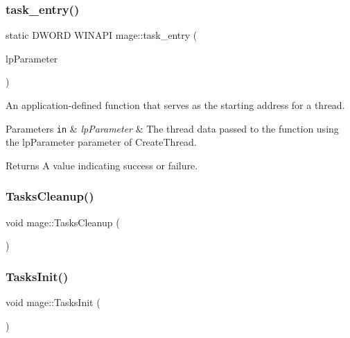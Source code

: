 \subsubsection{\texorpdfstring{task\+\_\+entry()}{task\_entry()}}
{\footnotesize\ttfamily static D\+W\+O\+RD W\+I\+N\+A\+PI mage\+::task\+\_\+entry (\begin{DoxyParamCaption}\item[{L\+P\+V\+O\+ID}]{lp\+Parameter }\end{DoxyParamCaption})\hspace{0.3cm}{\ttfamily [static]}}

An application-\/defined function that serves as the starting address for a thread.


\begin{DoxyParams}[1]{Parameters}
\mbox{\tt in}  & {\em lp\+Parameter} & The thread data passed to the function using the {\ttfamily lp\+Parameter} parameter of Create\+Thread. \\
\hline
\end{DoxyParams}
\begin{DoxyReturn}{Returns}
A value indicating success or failure. 
\end{DoxyReturn}
\hypertarget{namespacemage_a118ddaa5d9606328a0af412c85832e6b}{}\label{namespacemage_a118ddaa5d9606328a0af412c85832e6b} 
\subsubsection{\texorpdfstring{Tasks\+Cleanup()}{TasksCleanup()}}
{\footnotesize\ttfamily void mage\+::\+Tasks\+Cleanup (\begin{DoxyParamCaption}{ }\end{DoxyParamCaption})}

\hypertarget{namespacemage_a8252f7acebefd3efe34a15cc51e4a7ac}{}\label{namespacemage_a8252f7acebefd3efe34a15cc51e4a7ac} 
\subsubsection{\texorpdfstring{Tasks\+Init()}{TasksInit()}}
{\footnotesize\ttfamily void mage\+::\+Tasks\+Init (\begin{DoxyParamCaption}{ }\end{DoxyParamCaption})}

\hypertarget{namespacemage_a0c12a51bf3468b372932ffc1138a4ddc}{}\label{namespacemage_a0c12a51bf3468b372932ffc1138a4ddc} 

